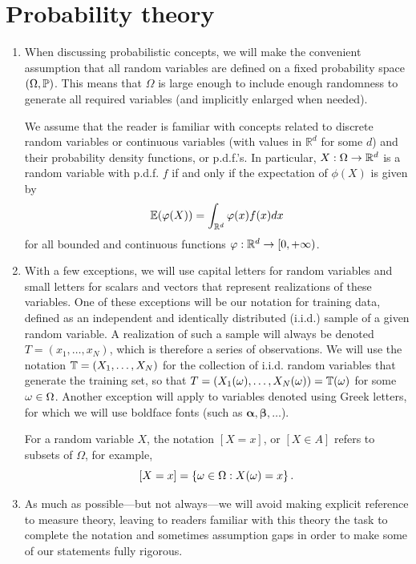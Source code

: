 \section{Probability theory}
 \begin{enumerate}[label={\bf \arabic*.}]
\item 

When discussing probabilistic concepts, we will make the convenient assumption that all random variables are defined on a fixed probability space $(\Omega, \bm{\mathbb P})$. This means that $\Omega$ is large enough to include enough randomness to generate all required variables (and implicitly enlarged when needed).

We assume that the reader is familiar with concepts related to discrete random variables or continuous variables (with values in  $\mathbb R^d$ for some $d$) and their probability density functions, or p.d.f.'s. In particular,  $X: \Omega\to {\mathbb{R}}^d$ is a random variable with  p.d.f. $f$ if and only if the expectation of $\phi(X)$ is given by
\[
\bm{\mathbb E}(\varphi(X)) = \int_{{\mathbb{R}}^d} \varphi(x) f(x) dx
\]
for all bounded and continuous functions $\varphi: {\mathbb{R}}^d \to [0, +\infty)$.

\item
With a few exceptions, we will use capital letters for random variables and small letters for scalars and vectors that  represent realizations of these variables. One of these exceptions will be our notation for training data, defined as an independent and identically distributed (i.i.d.) sample of a given random variable. A realization of such a sample will always be denoted  $T = (x_1, \ldots, x_N)$, which is therefore a series of observations. We will use the notation ${\mathbb T} = (X_1, \ldots, X_N)$ for the collection of i.i.d. random variables that generate the training set, so that $T = (X_1(\omega), \ldots, X_N(\omega)) = {\mathbb T}(\omega)$ for some $\omega\in \Omega$. Another exception will apply to variables denoted using Greek letters, for which we will use boldface fonts (such as $\boldsymbol\alpha, \boldsymbol\beta, \ldots$). 

For a random variable $X$, the notation $[X=x]$, or $[X\in A]$ refers to subsets of $\Omega$, for example,
\[
[X=x] = \left\{ \omega\in \Omega: X(\omega) = x \right\}.
\]

\item
 As much as possible---but not always---we will avoid making explicit  reference to measure theory, leaving to readers familiar with this theory the task to complete the notation and sometimes assumption gaps in order to make some of our statements fully rigorous. 


\end{enumerate}
